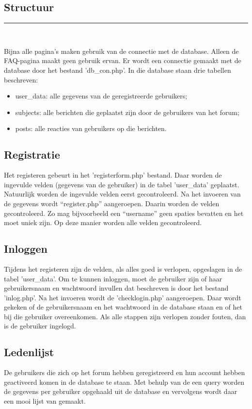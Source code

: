 \documentclass[a4paper,12pt]{article}
\newcommand{\HRule}{\rule{\linewidth}{0.5mm}}
\begin{document}
\begin{center}
\section[Structuur]{Structuur}
\HRule \\[0.5cm]
\end{center}
Bijna alle pagina’s maken gebruik van de connectie met de database. Alleen de FAQ-pagina maakt geen gebruik ervan. Er wordt een connectie gemaakt met de database door het bestand 'db\_con.php'. In die database staan drie tabellen beschreven: 
\begin{itemize}
\item user\_data: alle gegevens van de geregistreerde gebruikers;
\item subjects: alle berichten die geplaatst zijn door de gebruikers van het forum;
\item posts: alle reacties van gebruikers op die berichten.
\end{itemize}

\subsection[Registratie]{Registratie}
Het registeren gebeurt in het 'registerform.php' bestand. Daar worden de ingevulde velden (gegevens van de gebruiker) in de tabel 'user\_data' geplaatst. Natuurlijk worden de ingevulde velden eerst gecontroleerd. Na het invoeren van de gegevens wordt “register.php” aangeroepen. Daarin worden de velden gecontroleerd. Zo mag bijvoorbeeld een “username” geen spaties bevatten en het moet uniek zijn. Op deze manier worden alle velden gecontroleerd. 

\subsection[Inloggen]{Inloggen}
Tijdens het registeren zijn de velden, als alles goed is verlopen, opgeslagen in de tabel 'user\_data'. Om te kunnen inloggen, moet de gebruiker zijn of haar gebruikersnaam en wachtwoord invullen dat beschreven is door het bestand 'inlog.php'. Na het invoeren wordt de 'checklogin.php' aangeroepen. Daar wordt gekeken of de gebruikersnaam en het wachtwoord in de database staan en of het bij die gebruiker overeenkomen. Als alle stappen zijn verlopen zonder fouten, dan is de gebruiker ingelogd.

\subsection[Ledenlijst]{Ledenlijst}
De gebruikers die zich op het forum hebben geregistreerd en hun account hebben geactiveerd komen in de database te staan. Met behulp van de een query worden de gegevens per gebruiker opgehaald uit de database en vervolgens wordt daar een mooi lijst van gemaakt. 
\end{document}
